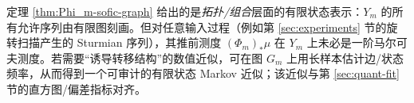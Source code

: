 



\begin{remark}\label{rem:Phi_m-not-markov}
定理 \ref{thm:Phi_m-sofic-graph} 给出的是\emph{拓扑/组合}层面的有限状态表示：$Y_m$ 的所有允许序列由有限图刻画。但对任意输入过程（例如第 \ref{sec:experiments} 节的旋转扫描产生的 Sturmian 序列），其推前测度 $(\Phi_m)_*\mu$ 在 $Y_m$ 上未必是一阶马尔可夫测度。若需要“诱导转移结构”的数值近似，可在图 $G_m$ 上用长样本估计边/状态频率，从而得到一个可审计的有限状态 Markov 近似；该近似与第 \ref{sec:quant-fit} 节的直方图/偏差指标对齐。
\end{remark}
